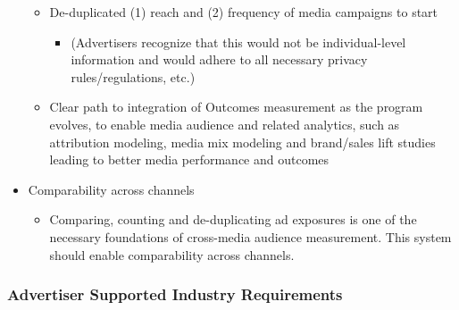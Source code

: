 \documentclass[]{article}
\providecommand{\tightlist}{%
  \setlength{\itemsep}{0pt}\setlength{\parskip}{0pt}}
\begin{document}
\begin{itemize}
  \begin{itemize}
  \tightlist
  \item
    De-duplicated (1) reach and (2) frequency of media campaigns to
    start

    \begin{itemize}
    \tightlist
    \item
      (Advertisers recognize that this would not be individual-level
      information and would adhere to all necessary privacy
      rules/regulations, etc.)
    \end{itemize}
  \item
    Clear path to integration of Outcomes measurement as the program
    evolves, to enable media audience and related analytics, such as
    attribution modeling, media mix modeling and brand/sales lift
    studies leading to better media performance and outcomes
  \end{itemize}
\item
  Comparability across channels

  \begin{itemize}
  \tightlist
  \item
    Comparing, counting and de-duplicating ad exposures is one of the
    necessary foundations of cross-media audience measurement. This
    system should enable comparability across channels.
  \end{itemize}
\end{itemize}


\subsubsection{Advertiser Supported Industry Requirements}
\end{document}
